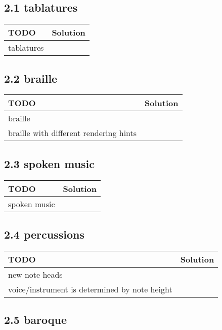  \subsection*{2.1 tablatures}
 \begin{tabular}{|p{}|p{}|}
 \hline
 \textbf{TODO} &
 \textbf{Solution} 
\\
 \hline
	tablatures &
  
\\ 	\hline
 \end{tabular} \subsection*{2.2 braille}
 \begin{tabular}{|p{}|p{}|}
 \hline
 \textbf{TODO} &
 \textbf{Solution} 
\\
 \hline
	braille &
  
\\ 	\hline
	braille with different rendering hints &
  
\\ 	\hline
 \end{tabular} \subsection*{2.3 spoken music}
 \begin{tabular}{|p{}|p{}|}
 \hline
 \textbf{TODO} &
 \textbf{Solution} 
\\
 \hline
	spoken music &
  
\\ 	\hline
 \end{tabular} \subsection*{2.4 percussions}
 \begin{tabular}{|p{}|p{}|}
 \hline
 \textbf{TODO} &
 \textbf{Solution} 
\\
 \hline
	new note heads &
  
\\ 	\hline
	voice/instrument is determined by note height &
  
\\ 	\hline
 \end{tabular} \subsection*{2.5 baroque}
